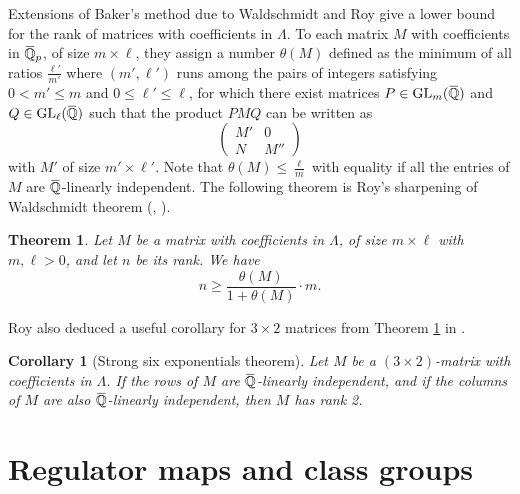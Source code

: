 \documentclass[12pt]{amsart}
\newcommand{\Q}{\mathbb{Q}}
\newcommand\bQ{\mathbb{Q}}
\newcommand{\ob}[1]{\mkern 1.5mu\overline{\mkern-1.5mu#1\mkern-1.5mu}\mkern 1.5mu}
\DeclareMathOperator{\GL}{GL}
\theoremstyle{defstyle}
\theoremstyle{thmstyle}
\newtheorem{theorem}[subsubsection]{Theorem}
\newtheorem{corollaire}[subsubsection]{Corollary}
\begin{document}
	Extensions of Baker's method due to Waldschmidt and Roy give a lower bound for the rank of matrices with coefficients in $\Lambda$. To each matrix $M$ with coefficients in $\ob{\bQ}_p$, of size $m\times \ell$, they assign a number $\theta(M)$ defined as the minimum of all ratios $\frac{\ell'}{m'}$ where $(m',\ell')$ runs among the pairs of integers satisfying $0<m'\leq m$ and $0\leq \ell'\leq \ell$, for which there exist matrices $P\in \GL_m(\ob{\bQ})$ and $Q\in\GL_\ell(\ob{\bQ})$ such that the product $PMQ$ can be written as
	\[\begin{pmatrix}
		M' & 0 \\ N & M''
	\end{pmatrix}\]
	with $M'$ of size $m' \times \ell'$. Note that $\theta(M) \leq \tfrac{\ell}{m}$ with equality if all the entries of $M$ are $\ob{\bQ}$-linearly independent. The following theorem is Roy's sharpening of Waldschmidt theorem (\cite[Théorème 2.1.p]{waldschmidt}, \cite[Corollary 1]{roy}).
	\begin{theorem}\label{thm:waldschmidt_roy}
		Let $M$ be a matrix with coefficients in $\Lambda$, of size $m\times \ell$ with $m,\ell>0$, and let $n$ be its rank. We have
		$$n \geq \frac{\theta(M)}{1+\theta(M)}\cdot m.$$
	\end{theorem} 
	
	Roy also deduced a useful corollary for $3\times 2$ matrices from Theorem \ref{thm:waldschmidt_roy} in \cite[Corollary 2]{roy}.
	\begin{corollaire}[Strong six exponentials theorem]\label{coro:strong_six_exponentials}
		Let $M$ be a $(3\times 2)$-matrix with coefficients in $\Lambda$. If the rows of $M$ are $\ob{\Q}$-linearly independent, and if the columns of $M$ are also $\ob{\Q}$-linearly independent, then $M$ has rank 2.
	\end{corollaire}
	
	
	
	\section{Regulator maps and class groups}\label{sec:regulator}
	
	
\end{document}
